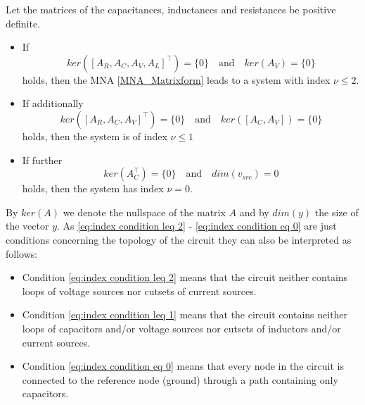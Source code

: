 \begin{theorem}
	Let the matrices of the capacitances, inductances and resistances be positive definite.
	\begin{itemize}
		\item If
		\begin{equation}
			\label{eq:index condition leq 2}
			ker([A_R, A_C, A_V, A_L]^\top) = \{0\} \quad \text{and} \quad ker(A_V) = \{0\}
		\end{equation}
		holds, then the MNA \eqref{MNA_Matrixform} leads to a system with index $\nu \leq 2$.
		
		\item If additionally
		\begin{equation}
			\label{eq:index condition leq 1}
			ker([A_R, A_C, A_V]^\top) = \{0\} \quad \text{and} \quad ker([A_C, A_V]) = \{0\}
		\end{equation}
		holds, then the system is of index $\nu \leq 1$
		
		\item If further
		\begin{equation}
			\label{eq:index condition eq 0}
			ker(A_C^\top) = \{0\} \quad \text{and} \quad dim(v_{src}) = 0
		\end{equation}
		holds, then the system has index $\nu = 0$.
	\end{itemize}
\end{theorem}

By $ker(A)$ we denote the nullspace of the matrix $A$ and by $dim(y)$ the size of the vector $y$. As \eqref{eq:index condition leq 2} - \eqref{eq:index condition eq 0} are just conditions concerning the topology of the circuit they can also be interpreted as follows:

\begin{itemize}
	\item Condition \eqref{eq:index condition leq 2} means that the circuit neither contains loops of voltage sources nor cutsets of current sources.
	\item Condition \eqref{eq:index condition leq 1} means that the circuit contains neither loops of capacitors and/or voltage sources nor cutsets of inductors and/or current sources.
	\item Condition \eqref{eq:index condition eq 0} means that every node in the circuit is connected to the reference node (ground) through a path containing only capacitors.
\end{itemize}

